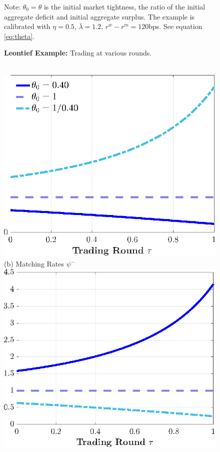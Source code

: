 \documentclass[12pt,american,english,notitlepage]{article}
\begin{document}
\begin{figure}[htb]
\caption{\label{fig:F_InterbankDay-Leontief}\textbf{Leontief Example:} Trading at various rounds.}
\parbox[t]{1.\textwidth}{Note: $\theta_{0}=\theta$ is the initial market
tightness, the ratio of the initial aggregate deficit and
initial aggregate surplus. The example is calibrated with $\eta=0.5$,
$\bar{\lambda}=1.2$, $r^{w}-r^{m}=120$bps. See equation \eqref{eq:theta}.}
\end{figure}

\begin{figure}[H]
\begin{centering}
 \\[2pt]
\includegraphics[width=0.8\linewidth]{NewCode/Figures/F_cd_gammaplus_tau.eps}
\endminipage\hfill
{}
\centering (b) Matching Rates $\psi^{-}$ \\[2pt]
\includegraphics[width=0.8\linewidth]{NewCode/Figures/F_cd_gammaminus_tau.eps}

\end{centering}
\end{figure}
\end{document}
